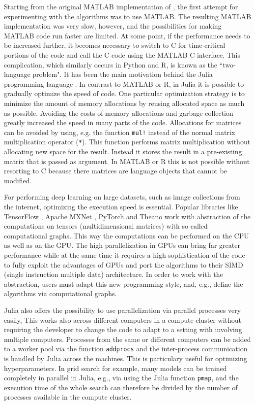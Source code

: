 \documentclass[12pt]{article}
\newcommand{\inlinecode}[1]{\texttt{#1}}
\begin{document}
Starting from the original MATLAB implementation of \cite{hinton_reducing_2006}, the first attempt for experimenting with the algorithms was to use MATLAB.
The resulting MATLAB implementation was very slow, however, and the possibilities for making MATLAB code run faster are limited.
At some point, if the performance needs to be increased further,  it becomes necessary to switch to C for time-critical portions of the code and call the C code using the MATLAB C interface.
This complication, which similarly occurs in Python and R, is known as the ``two-language problem".
It has been the main motivation behind the Julia programming language \citep{bezanson2017julia}.
In contrast to MATLAB or R, in Julia it is possible to gradually optimize the speed of code.
One particular optimization strategy is to minimize the amount of memory allocations by reusing allocated space as much as possible.
Avoiding the costs of memory allocations and garbage collection greatly increased the speed in many parts of the code.
Allocations for matrices can be avoided by using, e.g. the function \inlinecode{mul!} instead of the normal matrix multiplication operator (\inlinecode{*}).
This function performs matrix multiplication without allocating new space for the result.
Instead it stores the result in a pre-existing matrix that is passed as argument.
In MATLAB or R this is not possible without resorting to C because there matrices are language objects that cannot be modified.

For performing deep learning on large datasets, such as image collections from the internet, optimizing the execution speed is essential.
Popular libraries like TensorFlow \citep{abadi2016tensorflow}, Apache MXNet \citep{mxnet}, PyTorch \citep{pytorch} and Theano \citep{theano}
work with abstraction of the computations on tensors (multidimensional matrices) with so called computational graphs.
This way the computations can be performed on the CPU as well as on the GPU.
The high parallelization in GPUs can bring far greater performance while at the same time it requires a high sophistication of the code to fully exploit the advantages of GPUs and port the algorithms to their SIMD (single instruction multiple data) architecture.
In order to work with the abstraction, users must adapt this new programming style, and, e.g., define the algorithms via computational graphs.

Julia also offers the possibility to use parallelization via parallel processes very easily, This works also across different computers in a compute cluster without requiring the developer to change the code to adapt to a setting with involving multiple computers.
Processes from the same or different computers can be added to a worker pool via the function \inlinecode{addprocs} and the inter-process communication is handled by Julia across the machines.
This is particulary useful for optimizing hyperparameters.
In grid search \citep{bergstra_algorithms_2011} for example, many models can be trained completely in parallel in Julia, e.g., via using the Julia function  \inlinecode{pmap}, and the execution time of the whole search can therefore be divided by the number of processes available in the compute cluster.
\end{document}
